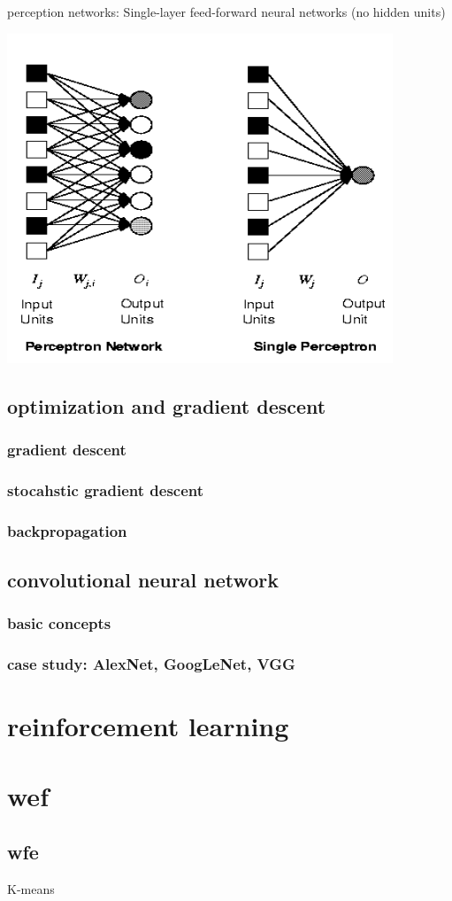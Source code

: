 \documentclass[11pt]{article}
\begin{document}
perception networks: Single-layer feed-forward neural networks (no hidden
units) 
\begin{center}
\includegraphics[width=.9\textwidth]{Perceptron}
\end{center}

\subsection{optimization and gradient descent}
\label{sec:org449278f}
\subsubsection{gradient descent}
\label{sec:org19fd15e}
\subsubsection{stocahstic gradient descent}
\label{sec:org8302cf2}
\subsubsection{backpropagation}
\label{sec:org8567dc4}
\subsection{convolutional neural network}
\label{sec:orga66fa9e}
\subsubsection{basic concepts}
\label{sec:org2935a3e}
\subsubsection{case study: AlexNet, GoogLeNet, VGG}
\label{sec:org0d60913}
\section{reinforcement learning}
\label{sec:org8c54625}

\section{wef}
\label{sec:orgae2a0a2}
\subsection{wfe}
\label{sec:org4379188}
K-means
\end{document}
